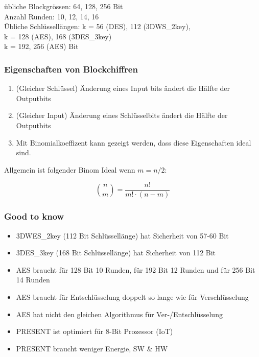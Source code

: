 \documentclass[12pt]{scrartcl}
\begin{document}
übliche Blockgrössen: 64, 128, 256 Bit \\
Anzahl Runden: 10, 12, 14, 16 \\
Übliche Schlüssellängen: 
k = 56 (DES), 112 (3DWS\_2key), \\
k = 128 (AES), 168 (3DES\_3key) \\
k = 192, 256 (AES) Bit\\


\subsubsection[Blockschiffren Eig.]{Eigenschaften von Blockchiffren}

\begin{enumerate}
    \item (Gleicher Schlüssel) Änderung eines Input bits ändert die Hälfte der Outputbits
    \item (Gleicher Input) Änderung eines Schlüsselbits ändert die Hälfte der Outputbits
    \item Mit Binomialkoeffizent kann gezeigt werden, dass diese Eigenschaften ideal sind.
\end{enumerate}

Allgemein ist folgender Binom Ideal wenn $m = n/2$:

$$ \binom{n}{m} = \frac{n!}{m! \cdot (n-m)} $$


\subsubsection{Good to know}

\begin{itemize}
    \item 3DWES\_2key (112 Bit Schlüssellänge) hat Sicherheit von 57-60 Bit
    \item 3DES\_3key (168 Bit Schlüssellänge) hat Sicherheit von 112 Bit
    \item AES braucht für 128 Bit 10 Runden, für 192 Bit 12 Runden und für 256 Bit 14 Runden
    \item AES braucht für Entschlüsselung doppelt so lange wie für Verschlüsselung
    \item AES hat nicht den gleichen Algorithmus für Ver-/Entschlüsselung
    \item PRESENT ist optimiert für 8-Bit Prozessor (IoT)
    \item PRESENT braucht weniger Energie, SW \& HW
\end{itemize}
\end{document}
